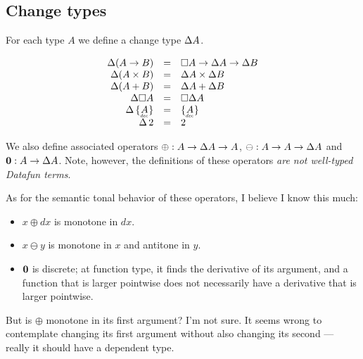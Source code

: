 \documentclass{article}
\begin{document}
\subsection{Change types}

For each type $A$ we define a change type $\Delta A$.

\[\begin{array}{rcl>{\quad\quad}rcl}
  \Ch(A \to B) &=& \Disc{A} \to \Ch A \to \Ch B\\
  \Ch(A \x B) &=& \Ch A \x \Ch B\\
  \Ch(A + B) &=& \Ch A + \Ch B\\
  \Ch \Disc{A} &=& \Disc{\Ch A}\\
  \Ch\thinspace \Seteq{A} &=& \Seteq{A}\\
  \Ch\thinspace \tbool &=& \tbool
\end{array}\]

We also define associated operators $\oplus : A \to \Delta A \to A$, $\ominus : A
\to A \to \Delta A$ and $\mathbf{0} : A \to \Delta A$. Note, however, the
definitions of these operators \emph{are not well-typed Datafun terms}. 

As for the semantic tonal behavior of these operators, I believe I know this
much:
\begin{itemize}
\item $x \oplus dx$ is monotone in $dx$.
\item $x \ominus y$ is monotone in $x$ and antitone in $y$.
\item $\mathbf{0}$ is discrete; at function type, it finds the derivative of its
  argument, and a function that is larger pointwise does not necessarily have a
  derivative that is larger pointwise.
\end{itemize}

But is $\oplus$ monotone in its first argument? I'm not sure. It seems wrong to
contemplate changing its first argument without also changing its second ---
really it should have a dependent type.
\end{document}
